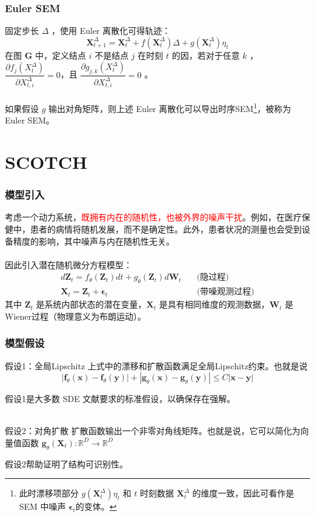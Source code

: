 \documentclass{beamer}
\begin{document}
\begin{frame}
\frametitle{Euler SEM}
固定步长 $\Delta$ ，使用 Euler 离散化可得轨迹：
\begin{equation}
    \boldsymbol X_{t+1}^\Delta=\boldsymbol X_t^\Delta+f(\boldsymbol X_t^\Delta)\Delta+g(\boldsymbol X_t^\Delta)\eta_t
\end{equation}
在图 $\boldsymbol G$ 中，定义结点 $i$ 不是结点 $j$ 在时刻 $t$ 的因，若对于任意 $k$ ，$\dfrac{\partial f_{j}(X_{t}^{\Delta})}{\partial X_{t,i}^{\Delta}}=0$，且 $\dfrac{\partial g_{j,k}(X_{t}^{\Delta})}{\partial X_{t,i}^{\Delta}}=0$ 。
\\~\\
如果假设 $g$ 输出对角矩阵，则上述 Euler 离散化可以导出时序SEM\footnote[frame]{此时漂移项部分 $g(\boldsymbol X_t^\Delta)\eta_t$ 和 $t$ 时刻数据 $\boldsymbol X_t^\Delta$ 的维度一致，因此可看作是 SEM 中噪声 $\boldsymbol{\epsilon}_{t}$的变体。}，被称为 Euler SEM。
\end{frame}
\section{SCOTCH}
\begin{frame}
\frametitle{模型引入}
考虑一个动力系统，\textcolor{red}{既拥有内在的随机性，也被外界的噪声干扰}。例如，在医疗保健中，患者的病情将随机发展，而不是确定性。此外，患者状况的测量也会受到设备精度的影响，其中噪声与内在随机性无关。
\\~\\
因此引入潜在随机微分方程模型：
\begin{equation}
\begin{aligned}
d\boldsymbol Z_t=f_\theta(\boldsymbol Z_t)dt+g_\theta(\boldsymbol Z_t)d\boldsymbol W_t\quad&\text{(隐过程)}\\
\boldsymbol X_t=\boldsymbol Z_t+\boldsymbol \epsilon_t\quad&\text{(带噪观测过程)}
\end{aligned}
\end{equation}
其中 $\boldsymbol Z_t$ 是系统内部状态的潜在变量，$\boldsymbol X_t$ 是具有相同维度的观测数据，$\boldsymbol W_t$ 是Wiener过程（物理意义为布朗运动）。
\end{frame}

\begin{frame}
\frametitle{模型假设}
\begin{block}{假设1：全局Lipschitz}
    上式中的漂移和扩散函数满足全局Lipschitz约束。也就是说
\vspace{-10pt}
\begin{equation}
    |\boldsymbol f_\theta(\boldsymbol x)-\boldsymbol f_\theta(\boldsymbol y)|+|\boldsymbol g_\theta(\boldsymbol x)-\boldsymbol g_\theta(\boldsymbol y)|\leq C|\boldsymbol x-\boldsymbol y|
\end{equation}
\end{block}
假设1是大多数 SDE 文献要求的标准假设，以确保存在强解。
\\~\\
\begin{block}{假设2：对角扩散}
    扩散函数输出一个非零对角线矩阵。也就是说，它可以简化为向量值函数 $\boldsymbol g_\theta(\boldsymbol X_t):\mathbb R^D\to\mathbb R^D$ 
\end{block}
假设2帮助证明了结构可识别性。
\end{frame}
\end{document}
